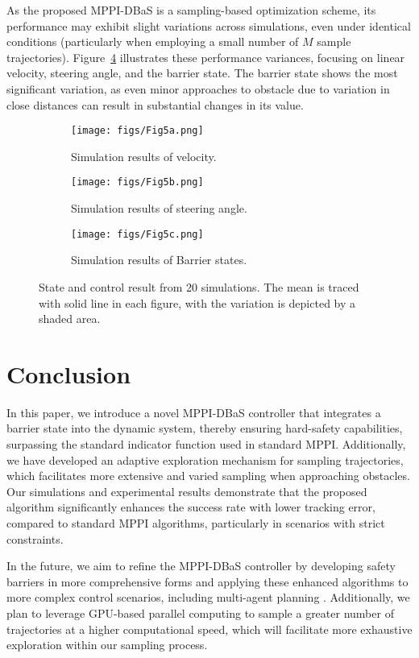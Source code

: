 \documentclass[english]{cccconf}
\begin{document}
As the proposed MPPI-DBaS is a sampling-based optimization scheme, its performance may exhibit slight variations across simulations, even under identical conditions (particularly when employing a small number of \( M \) sample trajectories). Figure~\ref{fig5} illustrates these performance variances, focusing on linear velocity, steering angle, and the barrier state. The barrier state shows the most significant variation, as even minor approaches to obstacle due to variation in close distances can result in substantial changes in its value.

\begin{figure}[!h]
     \centering
     \begin{subfigure}{0.3\textwidth}
         \centering
         \texttt{[image: figs/Fig5a.png]}
         \caption{Simulation results of velocity.}
         \label{fig5a}
     \end{subfigure}
     \hfill
     \begin{subfigure}{0.3\textwidth}
         \centering
         \texttt{[image: figs/Fig5b.png]}
         \caption{Simulation results of steering angle.}
         \label{fig5b}
     \end{subfigure}
     \hfill
     \begin{subfigure}{0.3\textwidth}
         \centering
         \texttt{[image: figs/Fig5c.png]}
         \caption{Simulation results of Barrier states.}
         \label{fig5c}
     \end{subfigure}
         \caption{State and control result from 20 simulations. The mean is traced with solid line in each figure, with the variation is depicted by a shaded area.}
        \label{fig5}
\end{figure}


\section{Conclusion} \label{Sec:con}
In this paper, we introduce a novel MPPI-DBaS controller that integrates a barrier state into the dynamic system, thereby ensuring hard-safety capabilities, surpassing the standard indicator function used in standard MPPI. Additionally, we have developed an adaptive exploration mechanism for sampling trajectories, which facilitates more extensive and varied sampling when approaching obstacles. Our simulations and experimental results demonstrate that the proposed algorithm significantly enhances the success rate with lower tracking error, compared to standard MPPI algorithms, particularly in scenarios with strict constraints.

 In the future, we aim to refine the MPPI-DBaS controller by developing safety barriers in more comprehensive forms and applying these enhanced algorithms to more complex control scenarios, including multi-agent planning \cite{zhang2024gcbf+}. Additionally, we plan to leverage GPU-based parallel computing \cite{tao2022path} to sample a greater number of trajectories at a higher computational speed, which will facilitate more exhaustive exploration within our sampling process.



\end{document}
